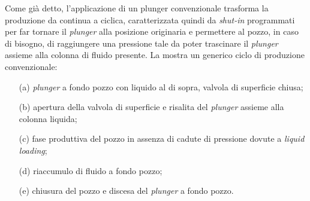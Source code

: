 Come già detto, l'applicazione di un plunger convenzionale trasforma la produzione da continua a ciclica, caratterizzata quindi da \textit{shut-in} programmati per far tornare il \textit{plunger} alla posizione originaria e permettere al pozzo, in caso di bisogno, di raggiungere una pressione tale da poter trascinare il \textit{plunger} assieme alla colonna di fluido presente. La  mostra un generico ciclo di produzione convenzionale:
\begin{enumerate}
    \item[(a)] \textit{plunger} a fondo pozzo con liquido al di sopra, valvola di superficie chiusa;
    \item[(b)] apertura della valvola di superficie e risalita del \textit{plunger} assieme alla colonna liquida;
    \item[(c)] fase produttiva del pozzo in assenza di cadute di pressione dovute a \textit{liquid loading};
    \item[(d)] riaccumulo di fluido a fondo pozzo;
    \item[(e)] chiusura del pozzo e discesa del \textit{plunger} a fondo pozzo.
\end{enumerate}

